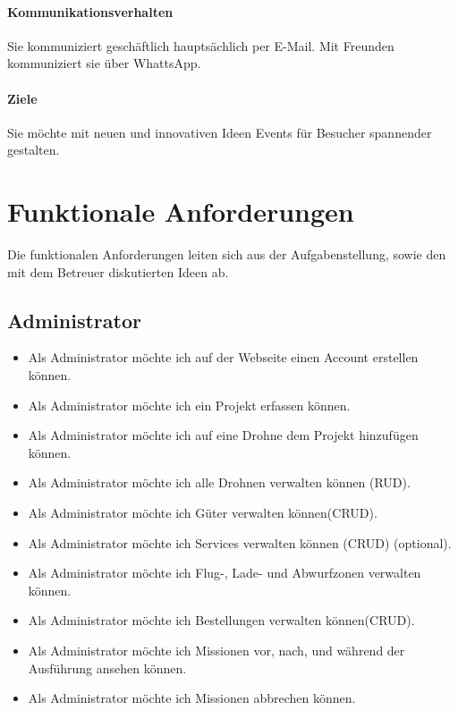 \paragraph{Kommunikationsverhalten}
Sie kommuniziert geschäftlich hauptsächlich per E-Mail. Mit Freunden kommuniziert sie über WhattsApp.

\paragraph{Ziele}
Sie möchte mit neuen und innovativen Ideen Events für Besucher spannender gestalten.

\section{Funktionale Anforderungen}

Die funktionalen Anforderungen leiten sich aus der Aufgabenstellung, sowie den mit dem Betreuer diskutierten Ideen ab.

\subsection{Administrator}
\begin{itemize}
\item Als Administrator möchte ich auf der Webseite einen Account erstellen können.
\item Als Administrator möchte ich ein Projekt erfassen können.
\item Als Administrator möchte ich auf eine Drohne dem Projekt hinzufügen können.
\item Als Administrator möchte ich alle Drohnen verwalten können (RUD).
\item Als Administrator möchte ich Güter verwalten können(CRUD).
\item Als Administrator möchte ich Services verwalten können (CRUD) (optional).
\item Als Administrator möchte ich Flug-, Lade- und Abwurfzonen verwalten können.
\item Als Administrator möchte ich Bestellungen verwalten können(CRUD).
\item Als Administrator möchte ich Missionen vor, nach, und während der Ausführung ansehen können.
\item Als Administrator möchte ich Missionen abbrechen können.
\end{itemize}

